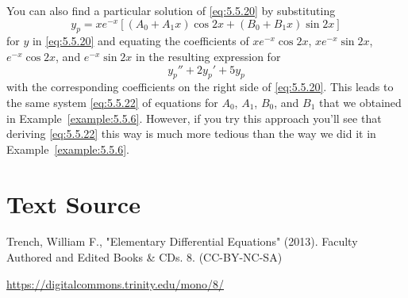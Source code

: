 \documentclass{ximera}
\begin{document}
You can also find a particular solution of \eqref{eq:5.5.20}
by substituting
$$
y_p=xe^{-x}\left[(A_0+A_1x)\cos 2x +(B_0+B_1x)\sin 2x\right]
$$
for $y$  in \eqref{eq:5.5.20}
and equating the  coefficients of $xe^{-x}\cos2x$,
$xe^{-x}\sin2x$, $e^{-x}\cos2x$, and $e^{-x}\sin2x$  in the
resulting expression for
$$
y_p''+2y_p'+5y_p
$$
with the corresponding coefficients on the right side of
\eqref{eq:5.5.20}. %
This leads to the
same system \eqref{eq:5.5.22} of equations for $A_0$, $A_1$, $B_0$, and
$B_1$ that we obtained in Example~\ref{example:5.5.6}. However, if you try
this approach you'll see that deriving \eqref{eq:5.5.22} this way is
much more tedious than the way we did it in Example~\ref{example:5.5.6}.

\section*{Text Source}
Trench, William F., "Elementary Differential Equations" (2013). Faculty Authored and Edited Books \& CDs. 8. (CC-BY-NC-SA)

\href{https://digitalcommons.trinity.edu/mono/8/}{https://digitalcommons.trinity.edu/mono/8/}
\end{document}
